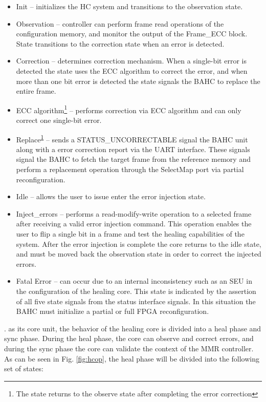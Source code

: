       \begin{itemize}
    \item Init -- initializes the HC system and transitions to the observation state.
    \item Observation -- controller can perform frame read operations of the configuration memory, and monitor the output of the Frame\_ECC block. State transitions to the correction state when an error is detected.
    \item Correction -- determines correction mechanism. When a single-bit error is detected the state uses the ECC algorithm to correct the error, and when more than one bit error is detected the state signals the BAHC to replace the entire frame. 
    \item ECC algorithm\footnote{\label{note1} The state returns to the observe state after completing the error correction} -- performs correction via ECC algorithm and can only correct one single-bit error.
    \item Replace\textsuperscript{\ref{note1}} --  sends a STATUS\_UNCORRECTABLE signal the BAHC unit along with a error correction report via the UART interface. These signals signal the BAHC to fetch the target frame from the reference memory and perform a replacement operation through the SelectMap port via partial reconfiguration.
    \item Idle -- allows the user to issue enter the error injection state. 
    \item Inject\_errors -- performs a read-modify-write operation to a selected frame after receiving a valid error injection command. This operation enables the user to flip a single bit in a frame and test the healing capabilities of the system. After the error injection is complete the core returns to the idle state, and must be moved back the observation state in order to correct the injected errors.
    \item Fatal Error -- can occur due to an internal inconsistency such as an SEU in the configuration of the healing core. This state is indicated by the assertion of all five state signals from the status interface signals. In this situation the BAHC must initialize a partial or full FPGA reconfiguration. 
\end{itemize}


. as its core unit, the behavior of the healing core is divided into a heal phase and sync phase. During the heal phase, the core can observe and correct errors, and during the sync phase the core can validate the context of the MMR controller. As can be seen in Fig. \ref{fig:hcop}, the heal phase will be divided into the following set of states:
